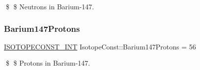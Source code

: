 \$ \$ Neutrons in Barium-\/147. \mbox{\label{group___isotope_const-_barium-_ba147_ga495b052713d08eefefeada312a58da6b}} 
\subsubsection{\texorpdfstring{Barium147\+Protons}{Barium147Protons}}
{\footnotesize\ttfamily \mbox{\hyperlink{group___isotope_const-_macros_ga5f18360b3e99483a35c32d789e62621c}{I\+S\+O\+T\+O\+P\+E\+C\+O\+N\+S\+T\+\_\+\+I\+NT}} Isotope\+Const\+::\+Barium147\+Protons = 56}

\$ \$ Protons in Barium-\/147. 